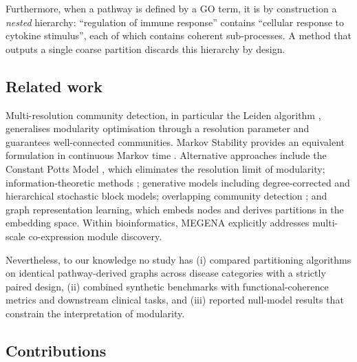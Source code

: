 \documentclass[twocolumn,11pt]{article}
\begin{document}
Furthermore, when a pathway is defined by a GO term, it is by construction a \emph{nested}
hierarchy: ``regulation of immune response'' contains ``cellular response to cytokine
stimulus'', each of which contains coherent sub-processes. A method that outputs a single
coarse partition discards this hierarchy by design.

\subsection{Related work}

Multi-resolution community detection, in particular the Leiden algorithm
\citep{traag2019leiden}, generalises modularity optimisation through a resolution
parameter and guarantees well-connected communities. Markov Stability provides an
equivalent formulation in continuous Markov time \citep{delvenne2010stability}.
Alternative approaches include the Constant Potts Model \citep{traag2011cpm}, which
eliminates the resolution limit of modularity; information-theoretic methods
\citep{rosvall2008infomap}; generative models including degree-corrected and hierarchical
stochastic block models; overlapping community detection \citep{ahn2010link,
lancichinetti2011oslom}; and graph representation learning, which embeds nodes and derives
partitions in the embedding space. Within bioinformatics, MEGENA \citep{song2015megena}
explicitly addresses multi-scale co-expression module discovery.

Nevertheless, to our knowledge no study has (i) compared partitioning algorithms on
identical pathway-derived graphs across disease categories with a strictly paired design,
(ii) combined synthetic benchmarks with functional-coherence metrics and downstream
clinical tasks, and (iii) reported null-model results that constrain the interpretation of
modularity.

\subsection{Contributions}
\end{document}
